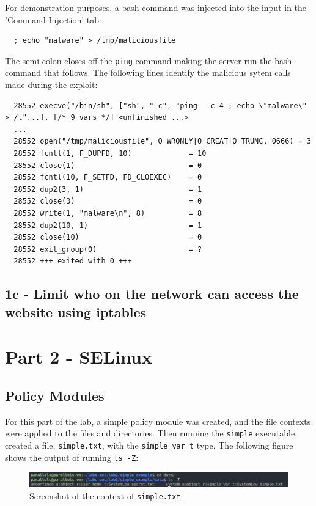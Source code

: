 \documentclass[11pt]{article}
\begin{document}
\noindent For demonstration purposes, a bash command was injected into the input in the 'Command Injection' tab:
\begin{verbatim}
  ; echo "malware" > /tmp/maliciousfile
\end{verbatim}

The semi colon closes off the \verb|ping| command making the server run the bash command that follows.
The following lines identify the malicious sytem calls made during the exploit:
\begin{verbatim}
  28552 execve("/bin/sh", ["sh", "-c", "ping  -c 4 ; echo \"malware\" > /t"...], [/* 9 vars */] <unfinished ...>
  ...
  28552 open("/tmp/maliciousfile", O_WRONLY|O_CREAT|O_TRUNC, 0666) = 3
  28552 fcntl(1, F_DUPFD, 10)             = 10
  28552 close(1)                          = 0
  28552 fcntl(10, F_SETFD, FD_CLOEXEC)    = 0
  28552 dup2(3, 1)                        = 1
  28552 close(3)                          = 0
  28552 write(1, "malware\n", 8)          = 8
  28552 dup2(10, 1)                       = 1
  28552 close(10)                         = 0
  28552 exit_group(0)                     = ?
  28552 +++ exited with 0 +++
\end{verbatim}

\subsection*{1c - Limit who on the network can access the website using iptables}


\section*{Part 2 - SELinux}
\label{sec:part-1}
\subsection*{Policy Modules}
For this part of the lab, a simple policy module was created, and the file contexts were applied to the files and directories.
Then running the \verb|simple| executable, created a file, \verb|simple.txt|, with the \verb|simple_var_t| type.
The following figure shows the output of running \verb|ls -Z|:
\begin{figure}[htbp]
  \centering
  \includegraphics[width=.71\linewidth]{./ls-z.png}
  \caption{\label{fig:ls-z}
  Screenshot of the context of \verb|simple.txt|.}
\end{figure}
\end{document}
